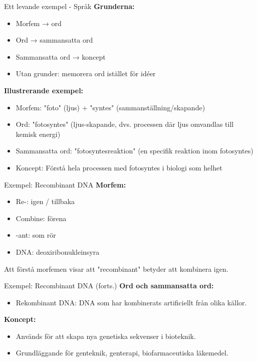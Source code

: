\documentclass[presentation]{beamer}
\begin{document}
\begin{frame}{Ett levande exempel - Språk}
\textbf{Grunderna:}
\begin{itemize}
\item Morfem → ord
\item Ord → sammansatta ord
\item Sammansatta ord → koncept
\item Utan grunder: memorera ord istället för idéer
\end{itemize}
\textbf{Illustrerande exempel:}
\begin{itemize}
\item Morfem: "foto" (ljus) + "syntes" (sammanställning/skapande)
\item Ord: "fotosyntes" (ljus-skapande, dvs. processen där ljus omvandlas till kemisk energi)
\item Sammansatta ord: "fotosyntesreaktion" (en specifik reaktion inom fotosyntes)
\item Koncept: Förstå hela processen med fotosyntes i biologi som helhet
\end{itemize}
\end{frame}

\begin{frame}{Exempel: Recombinant DNA}
  \textbf{Morfem:}
  \begin{itemize}
    \item Re-: igen / tillbaka
    \item Combine: förena
    \item -ant: som rör
    \item DNA: deoxiribonukleinsyra
  \end{itemize}
  Att förstå morfemen visar att "recombinant" betyder att kombinera igen.
\end{frame}

\begin{frame}{Exempel: Recombinant DNA (forts.)}
  \textbf{Ord och sammansatta ord:}
  \begin{itemize}
    \item Rekombinant DNA: DNA som har kombinerats artificiellt från olika källor.
  \end{itemize}
  \textbf{Koncept:}
  \begin{itemize}
    \item Används för att skapa nya genetiska sekvenser i bioteknik.
    \item Grundläggande för genteknik, genterapi, biofarmaceutiska läkemedel.
  \end{itemize}
\end{frame}
\end{document}
